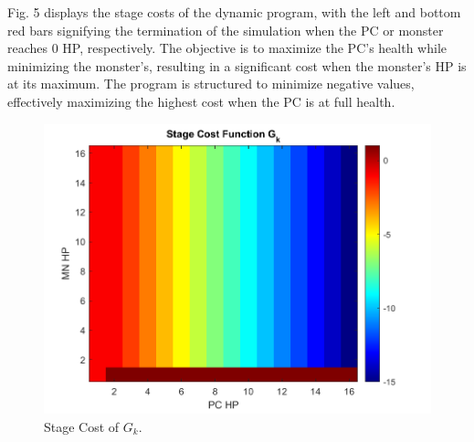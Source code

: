 \documentclass[letterpaper, 10 pt, conference]{ieeeconf}
\begin{document}
Fig. 5 displays the stage costs of the dynamic program, with the left and bottom red bars signifying the termination of the simulation 
when the PC or monster reaches 0 HP, respectively. The objective is to maximize the PC's health while minimizing the monster's, resulting in a 
significant cost when the monster's HP is at its maximum. The program is structured to minimize negative values, effectively maximizing the highest
cost when the PC is at full health.



\begin{figure}[thb]
    \centering
    \includegraphics[scale =0.44]{figs/DND_StageCost_G_k.png}
    \caption{Stage Cost of $G_k$.}
\end{figure}



{}

\end{document}
